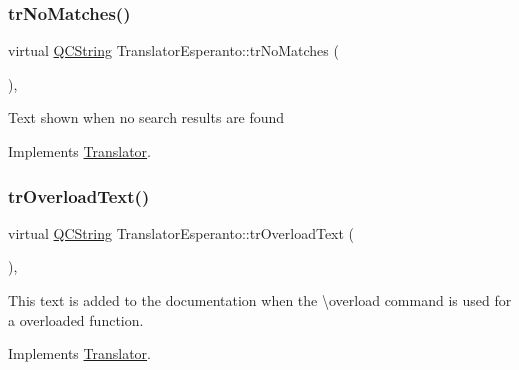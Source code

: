 \mbox{\label{class_translator_esperanto_a0309a695d6169e00ce7c0df1fc7ff5a1}} 
\subsubsection{\texorpdfstring{trNoMatches()}{trNoMatches()}}
{\footnotesize\ttfamily virtual \mbox{\hyperlink{class_q_c_string}{Q\+C\+String}} Translator\+Esperanto\+::tr\+No\+Matches (\begin{DoxyParamCaption}{ }\end{DoxyParamCaption})\hspace{0.3cm}{\ttfamily [inline]}, {\ttfamily [virtual]}}

Text shown when no search results are found 

Implements \mbox{\hyperlink{class_translator}{Translator}}.

\mbox{\label{class_translator_esperanto_a156f40236449926da6b59b70156b2fe5}} 
\subsubsection{\texorpdfstring{trOverloadText()}{trOverloadText()}}
{\footnotesize\ttfamily virtual \mbox{\hyperlink{class_q_c_string}{Q\+C\+String}} Translator\+Esperanto\+::tr\+Overload\+Text (\begin{DoxyParamCaption}{ }\end{DoxyParamCaption})\hspace{0.3cm}{\ttfamily [inline]}, {\ttfamily [virtual]}}

This text is added to the documentation when the \textbackslash{}overload command is used for a overloaded function. 

Implements \mbox{\hyperlink{class_translator}{Translator}}.

\mbox{\label{class_translator_esperanto_add07a784c6b80913775433daa91e35d9}} 
